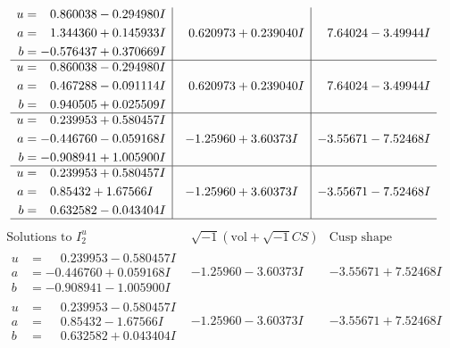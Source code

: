 \documentclass[1p]{elsarticle_modified}
\theoremstyle{definition}
\newcommand{\I}{\sqrt{-1}}
\begin{document}
$$\begin{array}{c|c|c}
\begin{aligned}
u &= \phantom{-}0.860038 - 0.294980 I \\
a &= \phantom{-}1.344360 + 0.145933 I \\
b &= -0.576437 + 0.370669 I\end{aligned}
 & \phantom{-}0.620973 + 0.239040 I & \phantom{-}7.64024 - 3.49944 I \\ \hline\begin{aligned}
u &= \phantom{-}0.860038 - 0.294980 I \\
a &= \phantom{-}0.467288 - 0.091114 I \\
b &= \phantom{-}0.940505 + 0.025509 I\end{aligned}
 & \phantom{-}0.620973 + 0.239040 I & \phantom{-}7.64024 - 3.49944 I \\ \hline\begin{aligned}
u &= \phantom{-}0.239953 + 0.580457 I \\
a &= -0.446760 - 0.059168 I \\
b &= -0.908941 + 1.005900 I\end{aligned}
 & -1.25960 + 3.60373 I & -3.55671 - 7.52468 I \\ \hline\begin{aligned}
u &= \phantom{-}0.239953 + 0.580457 I \\
a &= \phantom{-}0.85432 + 1.67566 I \\
b &= \phantom{-}0.632582 - 0.043404 I\end{aligned}
 & -1.25960 + 3.60373 I & -3.55671 - 7.52468 I\\
 \hline 
 \end{array}$$\newpage$$\begin{array}{c|c|c}  
\text{Solutions to }I^u_{2}& \I (\text{vol} + \sqrt{-1}CS) & \text{Cusp shape}\\
 \hline 
\begin{aligned}
u &= \phantom{-}0.239953 - 0.580457 I \\
a &= -0.446760 + 0.059168 I \\
b &= -0.908941 - 1.005900 I\end{aligned}
 & -1.25960 - 3.60373 I & -3.55671 + 7.52468 I \\ \hline\begin{aligned}
u &= \phantom{-}0.239953 - 0.580457 I \\
a &= \phantom{-}0.85432 - 1.67566 I \\
b &= \phantom{-}0.632582 + 0.043404 I\end{aligned}
 & -1.25960 - 3.60373 I & -3.55671 + 7.52468 I \\ \hline\begin{aligned}

\end{aligned}
\end{array}$$
\end{document}

